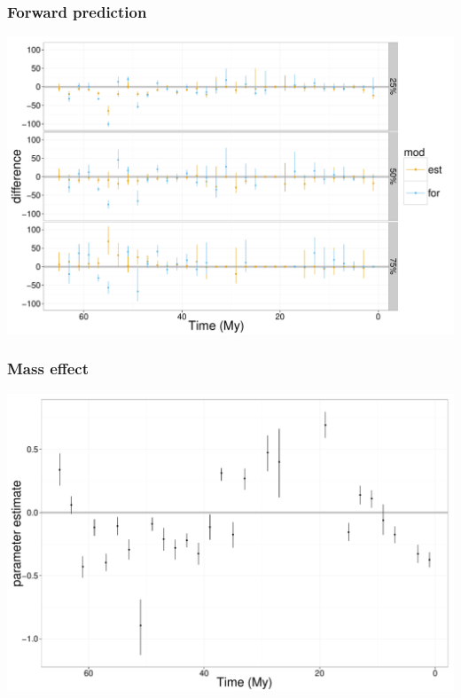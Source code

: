\documentclass{beamer}
\begin{document}
\begin{frame}
  \frametitle{Forward prediction}
  \begin{center}
    \includegraphics[height = 0.8\textheight, width = \textwidth,  keepaspectratio = true]{figure/discrepency}
  \end{center}
\end{frame}

\begin{frame}
  \frametitle{Mass effect}
  \begin{center}
    \includegraphics[height = 0.8\textheight, width = \textwidth,  keepaspectratio = true]{figure/body_est_time}
  \end{center}
\end{frame}
\end{document}
